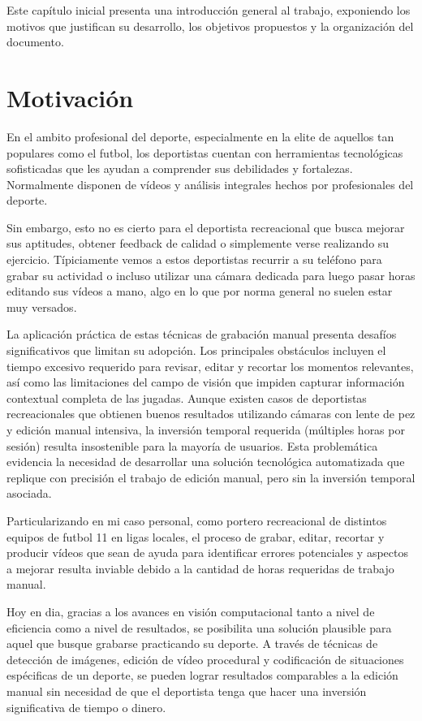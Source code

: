 Este capítulo inicial presenta una introducción general al trabajo, exponiendo los motivos que justifican su desarrollo, los objetivos propuestos y la organización del documento.

\section[Motivación]{Motivación}
En el ambito profesional del deporte, especialmente en la elite de aquellos tan populares como el futbol, los deportistas cuentan con herramientas tecnológicas sofisticadas que les ayudan a comprender sus debilidades y fortalezas. Normalmente disponen de vídeos y 
análisis integrales hechos por profesionales del deporte.

Sin embargo, esto no es cierto para el deportista recreacional que busca mejorar sus aptitudes, obtener feedback de calidad o simplemente verse realizando su ejercicio. Típiciamente vemos a estos deportistas recurrir a su teléfono para grabar su actividad o incluso utilizar una cámara dedicada para luego pasar horas editando sus vídeos a mano, algo en lo que por norma general no suelen estar muy versados.

La aplicación práctica de estas técnicas de grabación manual presenta desafíos significativos que limitan su adopción. Los principales obstáculos incluyen el tiempo excesivo requerido para revisar, editar y recortar los momentos relevantes, así como las limitaciones del campo de visión que impiden capturar información contextual completa de las jugadas. Aunque existen casos de deportistas recreacionales que obtienen buenos resultados utilizando cámaras con lente de pez y edición manual intensiva, la inversión temporal requerida (múltiples horas por sesión) resulta insostenible para la mayoría de usuarios. Esta problemática evidencia la necesidad de desarrollar una solución tecnológica automatizada que replique con precisión el trabajo de edición manual, pero sin la inversión temporal asociada.

Particularizando en mi caso personal, como portero recreacional de distintos equipos de futbol 11 en ligas locales, el proceso de grabar, editar, recortar y producir vídeos que sean de ayuda para identificar errores potenciales y aspectos a mejorar resulta inviable debido a la cantidad de horas requeridas de trabajo manual.

Hoy en dia, gracias a los avances en visión computacional tanto a nivel de eficiencia como a nivel de resultados, se posibilita una solución plausible para aquel que busque grabarse practicando su deporte. A través de técnicas de detección de imágenes, edición de vídeo procedural y codificación de situaciones espécificas de un deporte, se pueden lograr resultados comparables a la edición manual sin necesidad de que el deportista tenga que hacer una inversión significativa de tiempo o dinero.

